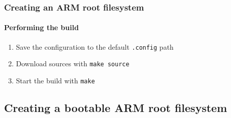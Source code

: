 {  \begin{frame}
    \frametitle{Creating an ARM root filesystem}
    \framesubtitle{Performing the build}
    \begin{enumerate}
      \item Save the configuration to the default \texttt{.config} path
      \item Download sources with \texttt{make source}
      \item Start the build with \texttt{make}
    \end{enumerate}
  \end{frame}
}
\subsection{Creating a bootable ARM root filesystem}
